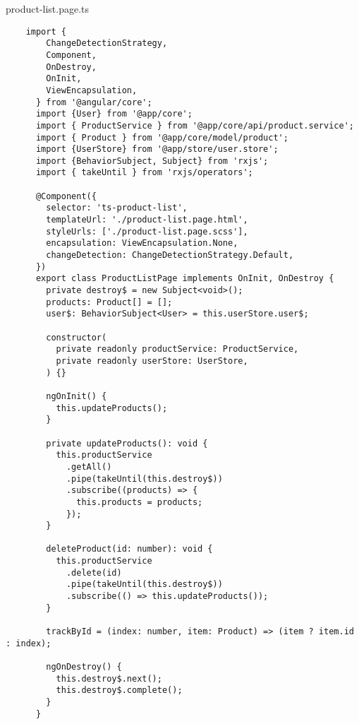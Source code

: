 product-list.page.ts
\begin{lstlisting}
    import {
        ChangeDetectionStrategy,
        Component,
        OnDestroy,
        OnInit,
        ViewEncapsulation,
      } from '@angular/core';
      import {User} from '@app/core';
      import { ProductService } from '@app/core/api/product.service';
      import { Product } from '@app/core/model/product';
      import {UserStore} from '@app/store/user.store';
      import {BehaviorSubject, Subject} from 'rxjs';
      import { takeUntil } from 'rxjs/operators';
      
      @Component({
        selector: 'ts-product-list',
        templateUrl: './product-list.page.html',
        styleUrls: ['./product-list.page.scss'],
        encapsulation: ViewEncapsulation.None,
        changeDetection: ChangeDetectionStrategy.Default,
      })
      export class ProductListPage implements OnInit, OnDestroy {
        private destroy$ = new Subject<void>();
        products: Product[] = [];
        user$: BehaviorSubject<User> = this.userStore.user$;
      
        constructor(
          private readonly productService: ProductService,
          private readonly userStore: UserStore,
        ) {}
      
        ngOnInit() {
          this.updateProducts();
        }
      
        private updateProducts(): void {
          this.productService
            .getAll()
            .pipe(takeUntil(this.destroy$))
            .subscribe((products) => {
              this.products = products;
            });
        }
      
        deleteProduct(id: number): void {
          this.productService
            .delete(id)
            .pipe(takeUntil(this.destroy$))
            .subscribe(() => this.updateProducts());
        }
      
        trackById = (index: number, item: Product) => (item ? item.id : index);
      
        ngOnDestroy() {
          this.destroy$.next();
          this.destroy$.complete();
        }
      }      
\end{lstlisting}

